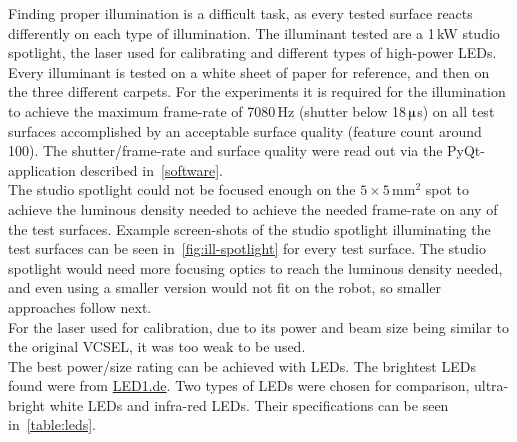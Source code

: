 \documentclass[12pt,a4paper]{article}
\begin{document}
Finding proper illumination is a difficult task, as every tested surface reacts differently on each type of illumination.
The illuminant tested are a 1\,kW studio spotlight, the laser used for calibrating and different types of high-power LEDs.
Every illuminant is tested on a white sheet of paper for reference, and then on the three different carpets.
For the experiments it is required for the illumination to achieve the maximum frame-rate of 7080\,Hz (shutter below 18\,$\muup$s) on all test surfaces accomplished by an acceptable surface quality (feature count around 100).
The shutter/frame-rate and surface quality were read out via the PyQt-application described in~\autoref{software}.\\
The studio spotlight could not be focused enough on the $5\times5$\,mm$^2$ spot to achieve the luminous density needed to achieve the needed frame-rate on any of the test surfaces.
Example screen-shots of the studio spotlight illuminating the test surfaces can be seen in~\autoref{fig:ill-spotlight} for every test surface.
The studio spotlight would need more focusing optics to reach the luminous density needed, and even using a smaller version would not fit on the robot, so smaller approaches follow next.\\
For the laser used for calibration, due to its power and beam size being similar to the original VCSEL, it was too weak to be used.\\
The best power/size rating can be achieved with LEDs.
The brightest LEDs found were from \href{http://www.led1.de}{LED1.de}.
Two types of LEDs were chosen for comparison, ultra-bright white LEDs and infra-red LEDs.
Their specifications can be seen in~\autoref{table:leds}.
\end{document}
